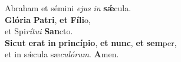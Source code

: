 \evenverse Abraham et sémini \textit{e}\textit{jus} \textit{in} \textbf{sǽ}cula.\\
\oddverse \textbf{Gló}\textbf{ri}\textbf{a} \textbf{Pa}\textbf{tri}, \textbf{et} \textbf{Fí}\textbf{li}o,~\*\\
\oddverse et Spi\textit{rí}\textit{tu}\textit{i} \textbf{San}cto.\\
\evenverse \textbf{Si}\textbf{cut} \textbf{e}\textbf{rat} \textbf{in} \textbf{prin}\textbf{cí}\textbf{pi}\textbf{o}, \textbf{et} \textbf{nunc}, \textbf{et} \textbf{sem}per,~\*\\
\evenverse et in sǽcula sæ\textit{cu}\textit{ló}\textit{rum}. \textbf{A}men.\\
